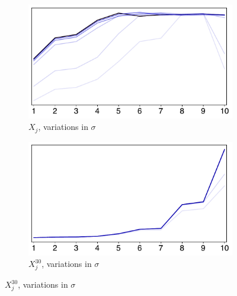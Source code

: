 \documentclass[../main.tex]{subfiles}
\begin{document}
\begin{figure}[H]
    \begin{subfigure}[b]{0.39\linewidth}
        \centering
        \includegraphics[width=\linewidth]{sigma_id1.pdf}
        \vspace{-0.6cm}
        \caption{$X_j$, variations in $\sigma$}
        \label{fig:sigma1}
    \end{subfigure}
    \hspace{0.07\linewidth}  %
    \begin{subfigure}[b]{0.39\linewidth}
        \centering
        \includegraphics[width=\linewidth]{sigma_id2.pdf}
        \vspace{-0.6cm}
        \caption{$X_j^{30}$, variations in $\sigma$}
        \label{fig:sigma2}
    \end{subfigure}

    \vspace{0.3cm}


\end{figure}
\end{document}
